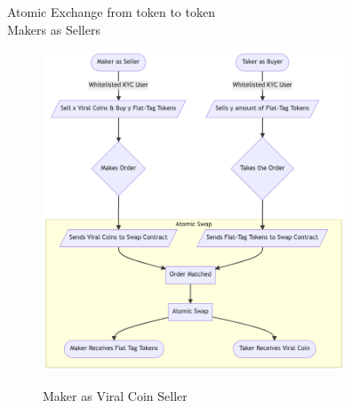 \documentclass[10pt]{article}
\begin{document}

Atomic Exchange from token to token\\

Makers as Sellers\\

\begin{figure}[H]
\begin{center}
\includegraphics[width=9cm]{maker-as-seller}\\
\caption{Maker as Viral Coin Seller}
\end{center}
\end{figure}

\end{document}
